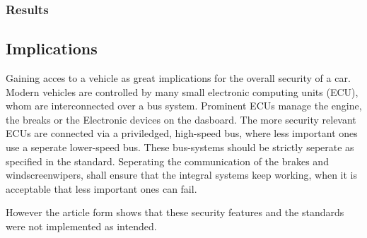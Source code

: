 \subsubsection*{Results}

\subsection*{Implications}
\label{sec:attackImplications}
Gaining acces to a vehicle as great implications for the overall security of a car.
Modern vehicles are controlled by many small electronic computing units (ECU),
whom are interconnected over a bus system.
Prominent ECUs manage the engine, the breaks or the Electronic devices on the dasboard.
The more security relevant ECUs are connected via a priviledged,
high-speed bus,
where less important ones use a seperate lower-speed bus.
These bus-systems should be strictly seperate as specified in the standard. %
Seperating the communication of the brakes and windscreenwipers,
shall ensure that the integral systems keep working,
when it is acceptable that less important ones can fail.

However the article form %
shows that these security features and the standards were not implemented as intended.

